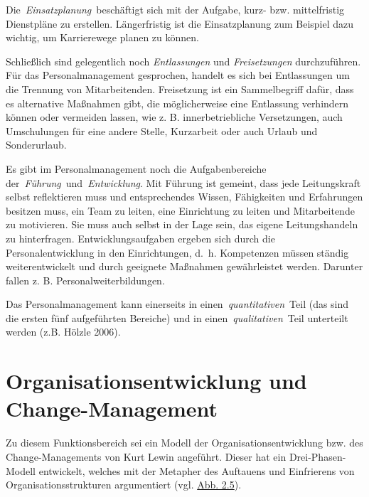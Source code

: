 \documentclass[
  letterpaper,
]{book}
\begin{document}
Die~\emph{Einsatzplanung}~beschäftigt sich mit der Aufgabe, kurz- bzw.
mittelfristig Dienstpläne zu erstellen. Längerfristig ist die
Einsatzplanung zum Beispiel dazu wichtig, um Karrierewege planen zu
können.

Schließlich sind gelegentlich noch \emph{Entlassungen} und
\emph{Freisetzungen} durchzuführen. Für das Personalmanagement
gesprochen, handelt es sich bei Entlassungen um die Trennung von
Mitarbeitenden. Freisetzung ist ein Sammelbegriff dafür, dass es
alternative Maßnahmen gibt, die möglicherweise eine Entlassung
verhindern können oder vermeiden lassen, wie z. B. innerbetriebliche
Versetzungen, auch Umschulungen für eine andere Stelle, Kurzarbeit oder
auch Urlaub und Sonderurlaub.

Es gibt im Personalmanagement noch die Aufgabenbereiche
der~\emph{Führung}~und~\emph{Entwicklung}. Mit Führung ist gemeint, dass
jede Leitungskraft selbst reflektieren muss und entsprechendes Wissen,
Fähigkeiten und Erfahrungen besitzen muss, ein Team zu leiten, eine
Einrichtung zu leiten und Mitarbeitende zu motivieren. Sie muss auch
selbst in der Lage sein, das eigene Leitungshandeln zu hinterfragen.
Entwicklungsaufgaben ergeben sich durch die Personalentwicklung in den
Einrichtungen, d.~h. Kompetenzen müssen ständig weiterentwickelt und
durch geeignete Maßnahmen gewährleistet werden. Darunter fallen z. B.
Personalweiterbildungen.

Das Personalmanagement kann einerseits in
einen~\emph{quantitativen}~Teil (das sind die ersten fünf aufgeführten
Bereiche) und in einen~\emph{qualitativen}~Teil unterteilt werden (z.B.
Hölzle 2006).

\section{Organisationsentwicklung und
Change-Management}\label{organisationsentwicklung-und-change-management}

Zu diesem Funktionsbereich sei ein Modell der Organisationsentwicklung
bzw. des Change-Managements von Kurt Lewin angeführt. Dieser hat ein
Drei-Phasen-Modell entwickelt, welches mit der Metapher des Auftauens
und Einfrierens von Organisationsstrukturen argumentiert (vgl.
\hyperref[figure25]{Abb. 2.5}).
\end{document}
